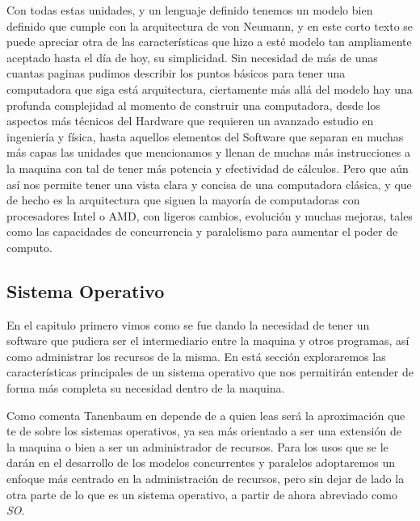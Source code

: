 \documentclass[letterpaper,12pt,oneside]{book}
\begin{document}
		Con todas estas unidades, y un lenguaje definido tenemos un modelo bien definido que cumple con la arquitectura de von Neumann, y en este corto 
		texto se puede apreciar otra de las características que hizo a esté modelo tan ampliamente aceptado hasta el día de hoy, su simplicidad. Sin 
		necesidad
		de más de unas cuantas paginas pudimos describir los puntos básicos para tener una computadora que siga está arquitectura, ciertamente más allá
		del modelo hay una profunda complejidad al momento de construir una computadora, desde los aspectos más técnicos del Hardware que requieren
		un avanzado estudio en ingeniería y física, hasta aquellos elementos del Software que separan en muchas más capas las unidades que mencionamos
		y llenan de muchas más instrucciones a la maquina con tal de tener más potencia y efectividad de cálculos\cite{tanenbaum_structured_2013}. Pero que 
		aún así nos permite
		tener una vista clara y concisa de una computadora clásica, y que de hecho es la arquitectura que siguen la mayoría de computadoras con
		procesadores Intel o AMD, con ligeros cambios, evolución y muchas mejoras, tales como las capacidades de concurrencia y paralelismo
		para aumentar el poder de computo.
		
	
		\subsection{Sistema Operativo}   
		
		En el capitulo primero vimos como se fue dando la necesidad de tener un software que pudiera ser el intermediario entre la maquina
		y otros programas, así como administrar los recursos de la misma. En está sección exploraremos las características principales
		de un sistema operativo que nos permitirán entender de forma más completa su necesidad dentro de la maquina.
		
		Como comenta Tanenbaum en \cite{tanenbaum_modern_2002} depende de a quien leas será la aproximación que te de sobre los sistemas operativos,
		ya sea más orientado a ser una extensión de la maquina o bien a ser un administrador de recursos. Para los usos que se le darán en el desarrollo
		de los modelos concurrentes y paralelos adoptaremos un enfoque más centrado en la administración de recursos, pero sin dejar de lado
		la otra parte de lo que es un sistema operativo, a partir de ahora abreviado como \textit{SO}.
		
\end{document}
